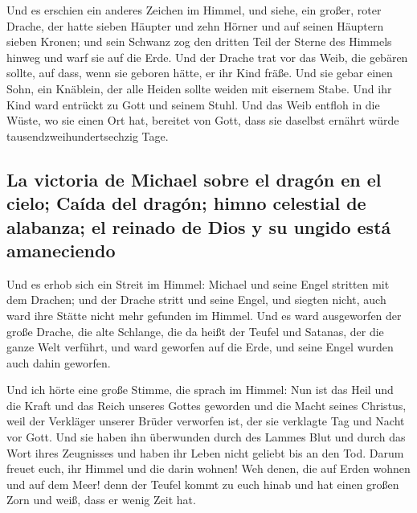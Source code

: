  Und es erschien ein anderes Zeichen im Himmel, und siehe,
ein großer, roter Drache, der hatte sieben Häupter und zehn Hörner und
auf seinen Häuptern sieben Kronen;  und sein Schwanz zog
den dritten Teil der Sterne des Himmels hinweg und warf sie auf die
Erde. Und der Drache trat vor das Weib, die gebären sollte, auf dass,
wenn sie geboren hätte, er ihr Kind fräße.  Und sie gebar
einen Sohn, ein Knäblein, der alle Heiden sollte weiden mit eisernem
Stabe. Und ihr Kind ward entrückt zu Gott und seinem Stuhl.
 Und das Weib entfloh in die Wüste, wo sie einen Ort hat,
bereitet von Gott, dass sie daselbst ernährt würde
tausendzweihundertsechzig Tage.

\hypertarget{la-victoria-de-michael-sobre-el-draguxf3n-en-el-cielo-cauxedda-del-draguxf3n-himno-celestial-de-alabanza-el-reinado-de-dios-y-su-ungido-estuxe1-amaneciendo}{%
\subsection{La victoria de Michael sobre el dragón en el cielo; Caída
del dragón; himno celestial de alabanza; el reinado de Dios y su ungido
está
amaneciendo}\label{la-victoria-de-michael-sobre-el-draguxf3n-en-el-cielo-cauxedda-del-draguxf3n-himno-celestial-de-alabanza-el-reinado-de-dios-y-su-ungido-estuxe1-amaneciendo}}

 Und es erhob sich ein Streit im Himmel: Michael und seine
Engel stritten mit dem Drachen; und der Drache stritt und seine Engel,
 und siegten nicht, auch ward ihre Stätte nicht mehr
gefunden im Himmel.  Und es ward ausgeworfen der große
Drache, die alte Schlange, die da heißt der Teufel und Satanas, der die
ganze Welt verführt, und ward geworfen auf die Erde, und seine Engel
wurden auch dahin geworfen.

 Und ich hörte eine große Stimme, die sprach im Himmel:
Nun ist das Heil und die Kraft und das Reich unseres Gottes geworden und
die Macht seines Christus, weil der Verkläger unserer Brüder verworfen
ist, der sie verklagte Tag und Nacht vor Gott.  Und sie
haben ihn überwunden durch des Lammes Blut und durch das Wort ihres
Zeugnisses und haben ihr Leben nicht geliebt bis an den Tod.
 Darum freuet euch, ihr Himmel und die darin wohnen! Weh
denen, die auf Erden wohnen und auf dem Meer! denn der Teufel kommt zu
euch hinab und hat einen großen Zorn und weiß, dass er wenig Zeit hat.

